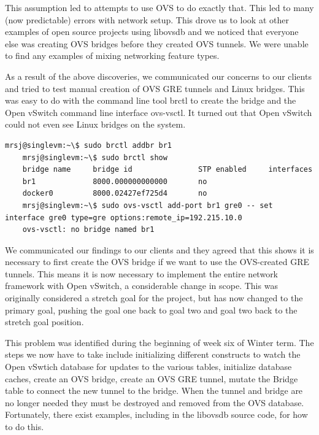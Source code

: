 \documentclass[10pt,onecolumn,journal,draftclsnofoot]{IEEEtran}
\begin{document}
This assumption led to attempts to use OVS to do exactly that. This led to many
(now predictable) errors with network setup. This drove us to look at other
examples of open source projects using libovsdb and we noticed that everyone
else was creating OVS bridges before they created OVS tunnels. We were unable to
find any examples of mixing networking feature types.

As a result of the above discoveries, we communicated our concerns to our
clients and tried to test manual creation of OVS GRE tunnels and Linux bridges.
This was easy to do with the command line tool brctl to create the bridge and
the Open vSwitch command line interface ovs-vsctl. It turned out that Open
vSwitch could not even see Linux bridges on the system.

\begin{lstlisting}[caption=No Linux Bridge and OVS Tunnel]
	mrsj@singlevm:~\$ sudo brctl addbr br1
	mrsj@singlevm:~\$ sudo brctl show
	bridge name     bridge id               STP enabled     interfaces
	br1             8000.000000000000       no
	docker0         8000.02427ef725d4       no
	mrsj@singlevm:~\$ sudo ovs-vsctl add-port br1 gre0 -- set interface gre0 type=gre options:remote_ip=192.215.10.0
	ovs-vsctl: no bridge named br1
\end{lstlisting}

We communicated our findings to our clients and they agreed that this shows it
is necessary to first create the OVS bridge if we want to use the OVS-created
GRE tunnels. This means it is now necessary to implement the entire network
framework with Open vSwitch, a considerable change in scope. This was originally
considered a stretch goal for the project, but has now changed to the primary
goal, pushing the goal one back to goal two and goal two back to the stretch
goal position.

This problem was identified during the beginning of week six of Winter term. The
steps we now have to take include initializing different constructs to watch the
Open vSwtich database for updates to the various tables, initialize database
caches, create an OVS bridge, create an OVS GRE tunnel, mutate the Bridge table
to connect the new tunnel to the bridge. When the tunnel and bridge are no
longer needed they must be destroyed and removed from the OVS database.
Fortunately, there exist examples, including in the libovsdb source code, for
how to do this.
\end{document}

